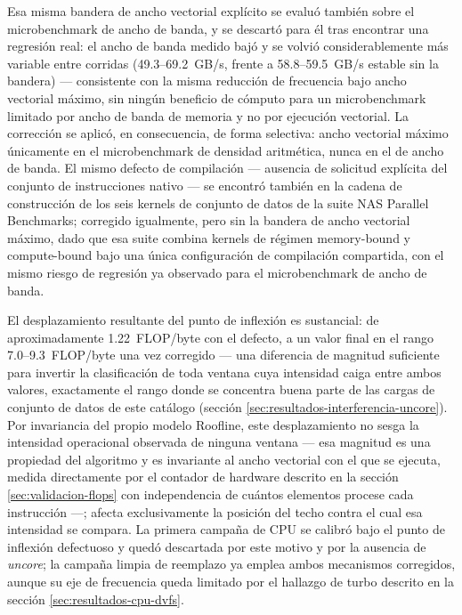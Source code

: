\documentclass[12pt,oneside,spanish]{book}
\begin{document}
Esa misma bandera de ancho vectorial explícito se evaluó también sobre el microbenchmark de ancho de banda, y se descartó para él tras encontrar una regresión real: el ancho de banda medido bajó y se volvió considerablemente más variable entre corridas (49.3--69.2~GB/s, frente a 58.8--59.5~GB/s estable sin la bandera) --- consistente con la misma reducción de frecuencia bajo ancho vectorial máximo, sin ningún beneficio de cómputo para un microbenchmark limitado por ancho de banda de memoria y no por ejecución vectorial. La corrección se aplicó, en consecuencia, de forma selectiva: ancho vectorial máximo únicamente en el microbenchmark de densidad aritmética, nunca en el de ancho de banda. El mismo defecto de compilación --- ausencia de solicitud explícita del conjunto de instrucciones nativo --- se encontró también en la cadena de construcción de los seis kernels de conjunto de datos de la suite NAS Parallel Benchmarks; corregido igualmente, pero sin la bandera de ancho vectorial máximo, dado que esa suite combina kernels de régimen memory-bound y compute-bound bajo una única configuración de compilación compartida, con el mismo riesgo de regresión ya observado para el microbenchmark de ancho de banda.

El desplazamiento resultante del punto de inflexión es sustancial: de aproximadamente 1.22~FLOP/byte con el defecto, a un valor final en el rango 7.0--9.3~FLOP/byte una vez corregido --- una diferencia de magnitud suficiente para invertir la clasificación de toda ventana cuya intensidad caiga entre ambos valores, exactamente el rango donde se concentra buena parte de las cargas de conjunto de datos de este catálogo (sección \ref{sec:resultados-interferencia-uncore}). Por invariancia del propio modelo Roofline, este desplazamiento no sesga la intensidad operacional observada de ninguna ventana --- esa magnitud es una propiedad del algoritmo y es invariante al ancho vectorial con el que se ejecuta, medida directamente por el contador de hardware descrito en la sección \ref{sec:validacion-flops} con independencia de cuántos elementos procese cada instrucción ---; afecta exclusivamente la posición del techo contra el cual esa intensidad se compara. La primera campaña de CPU se calibró bajo el punto de inflexión defectuoso y quedó descartada por este motivo y por la ausencia de \textit{uncore}; la campaña limpia de reemplazo ya emplea ambos mecanismos corregidos, aunque su eje de frecuencia queda limitado por el hallazgo de turbo descrito en la sección \ref{sec:resultados-cpu-dvfs}.
\end{document}
